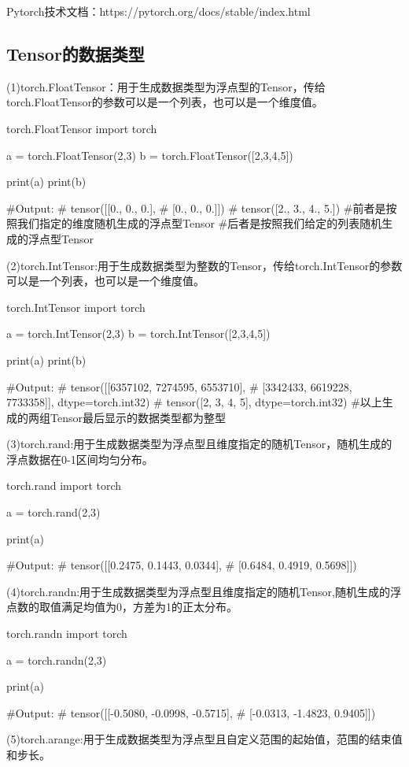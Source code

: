 \documentclass[openbib]{article}
\begin{document}
Pytorch技术文档：https://pytorch.org/docs/stable/index.html

\subsection{Tensor的数据类型}
(1)torch.FloatTensor：用于生成数据类型为浮点型的Tensor，传给torch.FloatTensor的参数可以是一个列表，也可以是一个维度值。
\begin{Python}{torch.FloatTensor}
	import torch
	
	a = torch.FloatTensor(2,3)
	b = torch.FloatTensor([2,3,4,5])
	
	print(a)
	print(b)
	
	#Output:
	#       tensor([[0., 0., 0.],
	#               [0., 0., 0.]])
	#       tensor([2., 3., 4., 5.])
	#前者是按照我们指定的维度随机生成的浮点型Tensor
	#后者是按照我们给定的列表随机生成的浮点型Tensor
\end{Python}
(2)torch.IntTensor:用于生成数据类型为整数的Tensor，传给torch.IntTensor的参数可以是一个列表，也可以是一个维度值。
\begin{Python}{torch.IntTensor}
	import torch
	
	a = torch.IntTensor(2,3)
	b = torch.IntTensor([2,3,4,5])
	
	print(a)
	print(b)
	
	#Output:
	#		tensor([[6357102, 7274595, 6553710],
	#				[3342433, 6619228, 7733358]], dtype=torch.int32)
	#		tensor([2, 3, 4, 5], dtype=torch.int32)
	#以上生成的两组Tensor最后显示的数据类型都为整型
\end{Python}
(3)torch.rand:用于生成数据类型为浮点型且维度指定的随机Tensor，随机生成的浮点数据在0-1区间均匀分布。
\begin{Python}{torch.rand}
	import torch
	
	a = torch.rand(2,3)
	
	print(a)
	
	#Output:
	#		tensor([[0.2475, 0.1443, 0.0344],
	#				[0.6484, 0.4919, 0.5698]])
\end{Python}
(4)torch.randn:用于生成数据类型为浮点型且维度指定的随机Tensor,随机生成的浮点数的取值满足均值为0，方差为1的正太分布。
\begin{Python}{torch.randn}
	import torch
	
	a = torch.randn(2,3)
	
	print(a)
	
	#Output:
	#		tensor([[-0.5080, -0.0998, -0.5715],
	#				[-0.0313, -1.4823,  0.9405]])
\end{Python}
(5)torch.arange:用于生成数据类型为浮点型且自定义范围的起始值，范围的结束值和步长。
\end{document}
